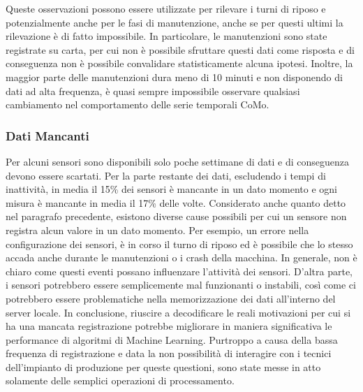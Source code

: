 Queste osservazioni possono essere utilizzate per rilevare i turni di riposo e potenzialmente anche per le fasi di manutenzione, anche se per questi ultimi la rilevazione è di fatto impossibile. In particolare, le manutenzioni sono state registrate su carta, per cui non è possibile sfruttare questi dati come risposta e di conseguenza non è possibile convalidare statisticamente alcuna ipotesi.
Inoltre, la maggior parte delle manutenzioni dura meno di 10 minuti e
non disponendo di dati ad alta frequenza, è quasi sempre impossibile
osservare qualsiasi cambiamento nel comportamento delle serie temporali CoMo. 

\subsubsection{Dati Mancanti}
Per alcuni sensori sono disponibili solo poche settimane di dati e di conseguenza devono essere scartati. Per la parte restante dei dati, escludendo i tempi di inattività, in media il 15\% dei sensori è mancante in un dato momento e ogni misura è mancante in media il 17\% delle volte. Considerato anche quanto detto nel paragrafo precedente, esistono diverse cause possibili per cui un sensore non registra alcun valore in un dato momento. Per esempio, un errore nella configurazione dei sensori, è in corso il turno di riposo ed è possibile che lo stesso accada anche durante le manutenzioni o i crash della macchina.
In generale, non è chiaro come questi eventi possano influenzare l'attività dei sensori. D'altra parte, i sensori potrebbero essere semplicemente mal funzionanti o instabili, così come ci potrebbero essere problematiche nella memorizzazione dei dati all'interno del server locale. 
In conclusione, riuscire a decodificare le reali motivazioni per cui si ha una mancata registrazione potrebbe migliorare in maniera significativa le performance di algoritmi di Machine Learning. Purtroppo a causa della bassa frequenza di registrazione e data la non possibilità di interagire con i tecnici dell'impianto di produzione per queste questioni, sono state messe in atto solamente delle semplici operazioni di processamento.

